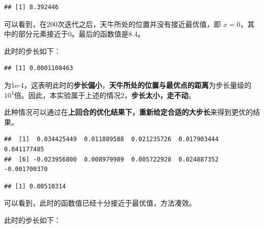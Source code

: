 \documentclass[]{ctexbook}
\newenvironment{Shaded}{\begin{snugshade}}{\end{snugshade}}
\newcommand{\KeywordTok}[1]{\textcolor[rgb]{0.13,0.29,0.53}{\textbf{#1}}}
\newcommand{\DataTypeTok}[1]{\textcolor[rgb]{0.13,0.29,0.53}{#1}}
\newcommand{\DecValTok}[1]{\textcolor[rgb]{0.00,0.00,0.81}{#1}}
\newcommand{\StringTok}[1]{\textcolor[rgb]{0.31,0.60,0.02}{#1}}
\newcommand{\OperatorTok}[1]{\textcolor[rgb]{0.81,0.36,0.00}{\textbf{#1}}}
\newcommand{\NormalTok}[1]{#1}
\begin{document}
\begin{verbatim}
## [1] 8.392446
\end{verbatim}

可以看到，在200次迭代之后，天牛所处的位置并没有接近最优值，即
\(x = 0\)，其中的部分元素接近于0。最后的函数值是8.4。

此时的步长如下：

\begin{Shaded}
\end{Shaded}

\begin{verbatim}
## [1] 0.0001108463
\end{verbatim}

为1e-4，这表明此时的\textbf{步长偏小}，\textbf{天牛所处的位置与最优点的距离}为步长量级的\(10^4\)倍。因此，本实验属于上述的情况2，\textbf{步长太小，走不动}。

此种情况可以通过在\textbf{上回合的优化结果下，重新给定合适的大步长}来得到更优的结果。

\begin{Shaded}
\end{Shaded}

\begin{verbatim}
##  [1]  0.034425449  0.011889588  0.021235726  0.017903444  0.041177485
##  [6] -0.023956800  0.008979989  0.005722928  0.024887352 -0.001700370
\end{verbatim}

\begin{verbatim}
## [1] 0.00510314
\end{verbatim}

可以看到，此时的函数值已经十分接近于最优值，方法凑效。

此时的步长如下：

\begin{Shaded}
\end{Shaded}
\end{document}
